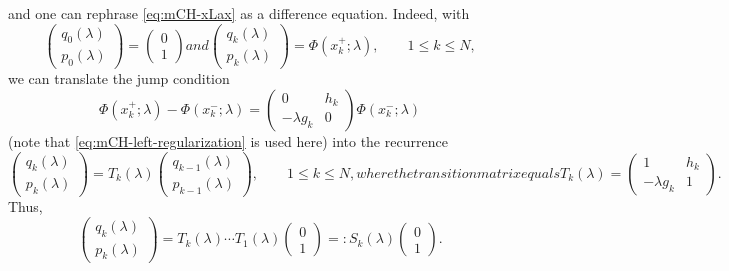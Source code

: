 \documentclass[10pt,a4paper]{article} \pdfoutput=1 
\begin{document}
and one can rephrase \eqref{eq:mCH-xLax} as a difference equation. Indeed, with
\begin{subequations} \label{eq:mCH-def-q-p}
\begin{equation}
  \begin{pmatrix} q_0(\lambda) \\ p_0(\lambda) \end{pmatrix}
  =
  \begin{pmatrix} 0 \\ 1 \end{pmatrix}
\end{equation}
and
\begin{equation}
  \begin{pmatrix} q_k(\lambda) \\ p_k(\lambda) \end{pmatrix}
  =
  \Phi(x_k^+;\lambda)
  ,\qquad
  1 \le k \le N
  ,
\end{equation}
\end{subequations}
we can translate the jump condition
\begin{equation}
  \Phi(x_k^+;\lambda) - \Phi(x_k^-;\lambda)
  = \begin{pmatrix} 0 & h_k \\ -\lambda g_k & 0 \end{pmatrix} \Phi(x_k^-;\lambda)
\end{equation}
(note that \eqref{eq:mCH-left-regularization} is used here)
into the recurrence
\begin{subequations} \label{eq:mCH-transition}
\begin{equation}
  \begin{pmatrix} q_k(\lambda) \\ p_k(\lambda) \end{pmatrix}
  = T_k(\lambda) \begin{pmatrix} q_{k-1}(\lambda) \\ p_{k-1}(\lambda) \end{pmatrix}
  ,\qquad
  1 \le k \le N
  ,
\end{equation}
where the transition matrix equals
\begin{equation}
  T_k(\lambda) =\begin{pmatrix} 1 & h_k \\ -\lambda g_k & 1 \end{pmatrix}
  .
\end{equation}
\end{subequations}
Thus,
\begin{equation*}
  \begin{pmatrix} q_k(\lambda) \\ p_k(\lambda) \end{pmatrix}
  = T_k(\lambda) \dotsm T_1(\lambda) \begin{pmatrix} 0 \\ 1 \end{pmatrix}
  =: S_k(\lambda) \begin{pmatrix} 0 \\ 1 \end{pmatrix}
  .
\end{equation*}
\end{document}

